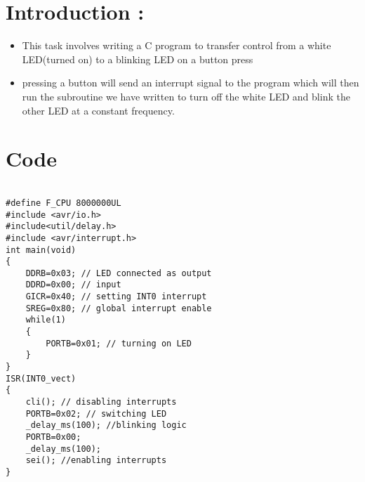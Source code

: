 \begin{center}
    \fbox{\Large{\textbf{\textcolor{red}{Interrupts in C}}}}
\end{center}
\section*{Introduction :}
\begin{itemize}
    \item This task involves writing a C program to transfer control 
			from a white LED(turned on) to a blinking LED on a button press
	\item pressing a button will send an interrupt signal to the program
			which will then run the subroutine we have written to turn off 
			the white LED and blink the other LED at a constant frequency.
\end{itemize}

\section*{Code}

\begin{lstlisting}[style=CStyle]

#define F_CPU 8000000UL
#include <avr/io.h>
#include<util/delay.h>
#include <avr/interrupt.h>
int main(void)
{
	DDRB=0x03; // LED connected as output
	DDRD=0x00; // input
	GICR=0x40; // setting INT0 interrupt
	SREG=0x80; // global interrupt enable
	while(1)
	{
		PORTB=0x01; // turning on LED
	}
}
ISR(INT0_vect)
{
	cli(); // disabling interrupts 
	PORTB=0x02; // switching LED
	_delay_ms(100); //blinking logic
	PORTB=0x00;
	_delay_ms(100);
	sei(); //enabling interrupts
}

\end{lstlisting}
